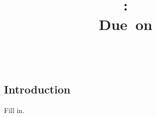 \documentclass{report} %
\title{\vspace{2in}\textmd{\textbf{\hmwkClass:\ \hmwkTitle\ifthenelse{\equal{\hmwkSubTitle}{}}{}{\\\hmwkSubTitle}}}\\\normalsize\vspace{0.1in}\small{Due\ on\ \hmwkDueDate}\\\vspace{0.1in}\large{\textit{\hmwkClassInstructor\ \hmwkClassTime}}\vspace{3in}}
\date{}
\author{\hmwkAuthor}
\begin{document}
\begin{spacing}{1.1}
\maketitle
%

\newpage
\thispagestyle{empty}
\mbox{}
\newpage
{}

\section{Introduction}
Fill in.

\end{spacing}
\end{document}
